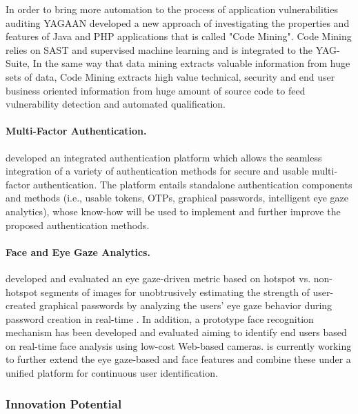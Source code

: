 \documentclass[a4paper,11pt]{article}
\begin{document}
In order to bring more automation to the process of application vulnerabilities auditing YAGAAN developed a new approach of investigating the properties and features of Java and PHP applications that is called "Code Mining". Code Mining relies on SAST and supervised machine learning and is integrated to the YAG-Suite, In the same way that data mining extracts valuable information from huge sets of data, Code Mining extracts high value technical, security and end user business oriented information from huge amount of source code to feed vulnerability detection and automated qualification.

\paragraph{\COGNIshort{} Multi-Factor Authentication.}

\COGNIshort{} developed an integrated authentication platform which allows the seamless integration of a variety of authentication methods for secure and usable multi-factor authentication. The platform entails standalone authentication components and methods (i.e., usable tokens, OTPs, graphical passwords, intelligent eye gaze analytics), whose know-how will be used to implement and further improve the proposed authentication methods.

\paragraph{\COGNIshort{} Face and Eye Gaze Analytics.}

\COGNIshort{} developed and evaluated an eye gaze-driven metric based on hotspot vs. non-hotspot segments of images for unobtrusively estimating the strength of user-created graphical passwords by analyzing the users' eye gaze behavior during password creation in real-time \cite{10.1145/3377325.3377537, 10.1145/3379336.3381460, 10.1145/3320435.3320474}. In addition, a prototype face recognition mechanism has been developed and evaluated aiming to identify end users based on real-time face analysis using low-cost Web-based cameras. \COGNIshort{} is currently working to further extend the eye gaze-based and face features and combine these under a unified platform for continuous user identification.

\subsubsection{Innovation Potential}
\label{sec:innovationpotential}
\label{innovationpotential}
\end{document}
